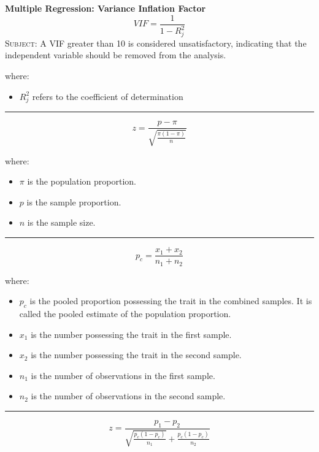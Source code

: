 \documentclass[	DIV=calc,%
							paper=a4,%
							fontsize=11pt,%
							twocolumn]{scrartcl} %
\newcommand{\hformbar}[1]{\vspace{5pt}\hrule\vspace{10pt}} %
\newcommand{\formdesc}[1]{\noindent\textbf{#1}}
\begin{document}
\formdesc{Multiple Regression: Variance Inflation Factor}
\begin{equation}
\label{multiple regression variance inflation factor}
VIF = \frac{1}{1 - R^2_{j}}
\end{equation}
\textsc{Subject:} A VIF greater than 10 is considered unsatisfactory, indicating that the independent variable should be removed from the analysis.

where:
\begin{itemize}
 \item $R^2_{j}$ refers to the coefficient of determination
\end{itemize}
\hformbar


\formdesc{Test of Hypothesis: One Proportion}
\begin{equation}
\label{test hypothesis one proportion}
z = \frac{p - \pi}{\sqrt{\frac{\pi(1 - \pi)}{n}}}
\end{equation}

where:
\begin{itemize}
 \item $\pi$ is the population proportion.
 \item $p$ is the sample proportion.
 \item $n$ is the sample size.
\end{itemize}
\hformbar


\formdesc{Test of Hypothesis: Pooled Proportion}
\begin{equation}
\label{test hypothesis pooled proportion}
p_c = \frac{x_1 + x_2}{n_1 + n_2}
\end{equation}

where:
\begin{itemize}
 \item $p_{c}$ is the pooled proportion possessing the trait in the combined samples. It is called the pooled estimate of the population proportion.
 \item $x_1$ is the number possessing the trait in the first sample.
 \item $x_2$ is the number possessing the trait in the second sample.
 \item $n_{1}$ is the number of observations in the first sample.
 \item $n_{2}$ is the number of observations in the second sample.
 \end{itemize}
\hformbar


\formdesc{Test of Hypothesis: Two-Sample Test of Proportions}
\begin{equation}
\label{test hypothesis two sample test proportion}
z = \frac{p_{1} - p_{2}}{\sqrt{\frac{p_{c}(1 - p_{c})}{n_{1}}} + \frac{p_{c}(1 - p_{c})}{n_{2}}}
\end{equation}
\end{document}
